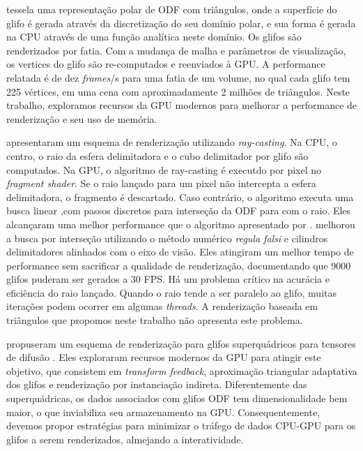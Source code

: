 \documentclass[
    12pt,                %
    oneside,            %
    a4paper,            %
    english,            %
    french,                %
    spanish,            %
    brazil                %
    ]{abntex2}
\begin{document}

 tessela uma representação polar de ODF com triângulos, onde a superfície do glifo é gerada através da discretização do seu domínio polar, e sua forma é gerada na CPU através de uma função analítica neste domínio. Os glifos são renderizados por fatia. Com a mudança de malha e parâmetros de visualização, os vertices do glifo são re-computados e reenviados à GPU. A performance relatada é de dez \textit{frames}/s para uma fatia de um volume, no qual cada glifo tem 225 vértices, em uma cena com aproximadamente 2 milhões de triângulos. Neste trabalho, exploramos recursos da GPU modernos para melhorar a performance de renderização e seu uso de memória.


 apresentaram um esquema de renderização utilizando \textit{ray-casting}. Na CPU, o centro, o raio da esfera delimitadora e o cubo delimitador por glifo são computados. Na GPU, o algoritmo de ray-casting é executdo por pixel no \textit{fragment shader}. Se o raio lançado para um pixel não intercepta a esfera delimitadora, o fragmento é descartado. Caso contrário, o algoritmo executa uma busca linear ,com passos discretos para interseção da ODF para com o raio. Eles alcançaram uma melhor performance que o algoritmo apresentado por .  melhorou a busca por interseção utilizando o método numérico \textit{regula falsi} e cilindros delimitadores alinhados com o eixo de visão. Eles atingiram um melhor tempo de performance sem sacrificar a qualidade de renderização, documentando que 9000 glifos puderam ser gerados a 30 FPS. Há um problema crítico na acurácia e eficiência do raio lançado. Quando o raio tende a ser paralelo ao glifo, muitas iterações podem ocorrer em algumas \textit{threads}. A renderização baseada em triângulos que propomos neste trabalho não apresenta este problema. 

 propuseram um esquema de renderização para glifos superquádricos para tensores de difusão \cite{Kindlmann2004}. Eles exploraram recursos modernos da GPU para atingir este objetivo, que consistem em \textit{transform feedback}, aproximação triangular adaptativa dos glifos e renderização por instanciação indireta. Diferentemente das superquádricas, os dados associados com glifos ODF tem dimensionalidade bem maior, o que inviabiliza seu armazenamento na GPU. Consequentemente, devemos propor estratégias para minimizar o tráfego de dados CPU-GPU para os glifos a serem renderizados, almejando a interatividade.
\end{document}
